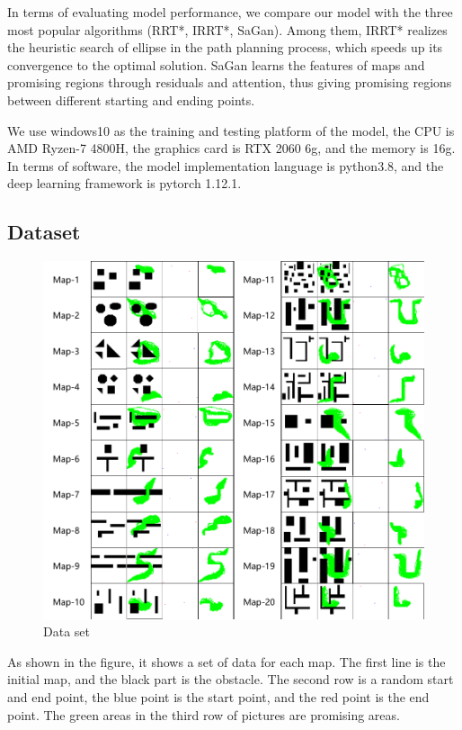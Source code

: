 \documentclass[smallcondensed]{svjour3}     %
\begin{document}
In terms of evaluating model performance, we compare our model with the three most popular algorithms (RRT*, IRRT*, SaGan). 
Among them, IRRT* realizes the heuristic search of ellipse in the path planning process, which speeds up its convergence to the optimal solution. 
SaGan learns the features of maps and promising regions through residuals and attention, thus giving promising regions between different starting and ending points.

We use windows10 as the training and testing platform of the model, the CPU is AMD Ryzen-7 4800H, the graphics card is RTX 2060 6g, and the memory is 16g. 
In terms of software, the model implementation language is python3.8, and the deep learning framework is pytorch 1.12.1.

\subsection{Dataset}
\begin{figure}
\centering
\includegraphics[scale=0.45]{data-set.pdf}%
\caption{Data set}     
\label{fig:data-set}
\end{figure}

As shown in the figure, it shows a set of data for each map. 
The first line is the initial map, and the black part is the obstacle. 
The second row is a random start and end point, the blue point is the start point, and the red point is the end point. 
The green areas in the third row of pictures are promising areas.
\end{document}

